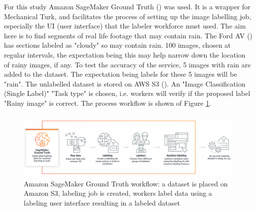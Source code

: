 For this study Amazon SageMaker Ground Truth (\cite{SageMakerGroundTruthDocumentation2020}) was used. It is a wrapper for Mechanical Turk, and facilitates the process of setting up the image labelling job, especially the UI (user interface) that the labeler workforce must used.  
The aim here is to find segments of real life footage that may contain rain. The Ford AV (\cite{agarwal2020ford}) has sections labeled as "cloudy" so may contain rain. 100 images, chosen at regular intervals, the expectation being this may help narrow down the location of rainy images, if any. To test the accuracy of the service, 5 images with rain are added to the dataset. The expectation being labels for these 5 images will be "rain". 
The unlabelled dataset is stored on AWS S3 (\cite{AmazonS3Documentation2020}). An "Image Classification (Single Label)" "Task type" is chosen, i.e. workers will verify if the proposed label "Rainy image" is correct. The process workflow is shown of Figure \ref{fig:amazon-ground-truth}.

\begin{figure}[ht]
 \centering 
 \includegraphics[width=\textwidth]{Figures/SageMakerGroundTruth.png}
 \caption{Amazon SageMaker Ground Truth workflow: a dataset is placed on Amazon S3, labeling job is created, workers label data using a labeling user interface resulting in a labeled dataset}
 \label{fig:amazon-ground-truth}
\end{figure}



